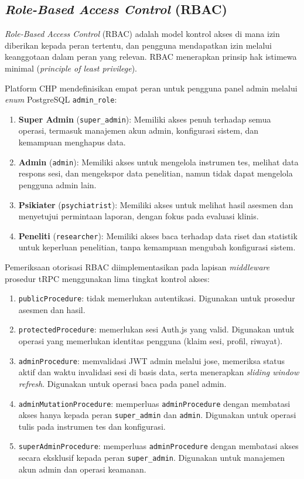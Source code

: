 \subsection{\textit{Role-Based Access Control} (RBAC)}
\label{subsec:rbac}

\textit{Role-Based Access Control} (RBAC) adalah model kontrol akses di mana izin diberikan kepada peran tertentu, dan pengguna mendapatkan izin melalui keanggotaan dalam peran yang relevan. RBAC menerapkan prinsip hak istimewa minimal (\textit{principle of least privilege}).

Platform CHP mendefinisikan empat peran untuk pengguna panel admin melalui \textit{enum} PostgreSQL \texttt{admin\_role}:

\begin{enumerate}[leftmargin=2cm]
  \item \textbf{Super Admin} (\texttt{super\_admin}): Memiliki akses penuh terhadap semua operasi, termasuk manajemen akun admin, konfigurasi sistem, dan kemampuan menghapus data.
  \item \textbf{Admin} (\texttt{admin}): Memiliki akses untuk mengelola instrumen tes, melihat data respons sesi, dan mengekspor data penelitian, namun tidak dapat mengelola pengguna admin lain.
  \item \textbf{Psikiater} (\texttt{psychiatrist}): Memiliki akses untuk melihat hasil asesmen dan menyetujui permintaan laporan, dengan fokus pada evaluasi klinis.
  \item \textbf{Peneliti} (\texttt{researcher}): Memiliki akses baca terhadap data riset dan statistik untuk keperluan penelitian, tanpa kemampuan mengubah konfigurasi sistem.
\end{enumerate}

Pemeriksaan otorisasi RBAC diimplementasikan pada lapisan \textit{middleware} prosedur tRPC menggunakan lima tingkat kontrol akses:

\begin{enumerate}[leftmargin=2cm]
  \item \texttt{publicProcedure}: tidak memerlukan autentikasi. Digunakan untuk prosedur asesmen dan hasil.
  \item \texttt{protectedProcedure}: memerlukan sesi Auth.js yang valid. Digunakan untuk operasi yang memerlukan identitas pengguna (klaim sesi, profil, riwayat).
  \item \texttt{adminProcedure}: memvalidasi JWT admin melalui jose, memeriksa status aktif dan waktu invalidasi sesi di basis data, serta menerapkan \textit{sliding window refresh}. Digunakan untuk operasi baca pada panel admin.
  \item \texttt{adminMutationProcedure}: memperluas \texttt{adminProcedure} dengan membatasi akses hanya kepada peran \texttt{super\_admin} dan \texttt{admin}. Digunakan untuk operasi tulis pada instrumen tes dan konfigurasi.
  \item \texttt{superAdminProcedure}: memperluas \texttt{adminProcedure} dengan membatasi akses secara eksklusif kepada peran \texttt{super\_admin}. Digunakan untuk manajemen akun admin dan operasi keamanan.
\end{enumerate}


